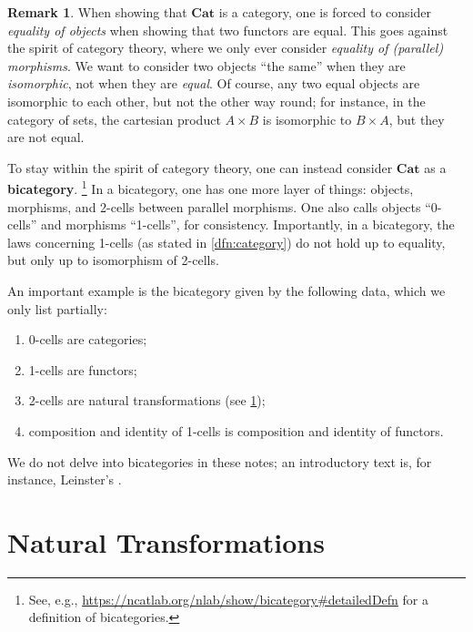 \documentclass[a4paper,10pt]{scrartcl}
\theoremstyle{plain}
\theoremstyle{definition}
\newtheorem{rem}[thm]{Remark}
\newcommand{\Catb}[1]{\mathbf{#1}}
\newcommand{\CAT}{\Catb{Cat}}
\begin{document}
\begin{rem}
  When showing that $\CAT$ is a category, one is forced to consider \emph{equality of objects} when showing that two functors are equal.
  This goes against the spirit of category theory, where we only ever consider \emph{equality of (parallel) morphisms}.
  We want to consider two objects ``the same'' when they are \emph{isomorphic}, not when they are \emph{equal}. Of course, any two equal objects are isomorphic to each other, but not the other way round; for instance, in the category of sets, the cartesian product $A \times B$ is isomorphic to $B \times A$, but they are not equal.

  To stay within the spirit of category theory, one can instead consider $\CAT$ as a \textbf{bicategory}.%
  \footnote{See, e.g.,   \url{https://ncatlab.org/nlab/show/bicategory\#detailedDefn} for a definition of bicategories.}
  In a bicategory, one has one more layer of things: objects, morphisms, and 2-cells between parallel morphisms. One also calls objects ``0-cells'' and morphisms ``1-cells'', for consistency.
  Importantly, in a bicategory, the laws concerning 1-cells (as stated in \cref{dfn:category}) do not hold up to equality, but only up to isomorphism of 2-cells.

  An important example is the bicategory given by the following data, which we only list partially:
  \begin{enumerate}
  \item 0-cells are categories;
  \item 1-cells are functors;
  \item 2-cells are natural transformations (see \cref{sec:nat-trans});
  \item composition and identity of 1-cells is composition and identity of functors.
  \end{enumerate}

  We do not delve into bicategories in these notes; an introductory text is, for instance, Leinster's \cite{leinster:basic-bicats}.
\end{rem}




\section{Natural Transformations}
\label{sec:nat-trans}
\end{document}
